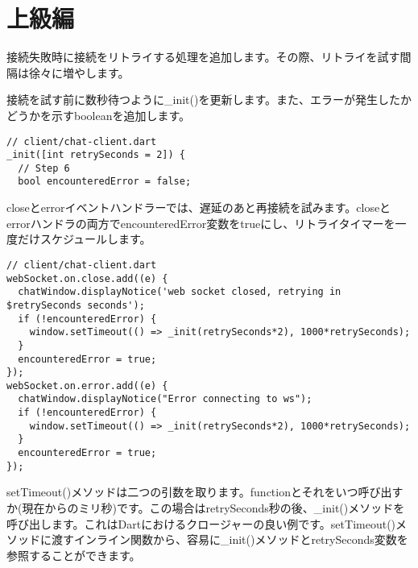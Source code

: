 
\section{上級編}

接続失敗時に接続をリトライする処理を追加します。その際、リトライを試す間隔は徐々に増やします。

接続を試す前に数秒待つように\_init()を更新します。また、エラーが発生したかどうかを示すbooleanを追加します。

\begin{verbatim}
// client/chat-client.dart
_init([int retrySeconds = 2]) {
  // Step 6
  bool encounteredError = false;
\end{verbatim}

closeとerrorイベントハンドラーでは、遅延のあと再接続を試みます。closeとerrorハンドラの両方でencounteredError変数をtrueにし、リトライタイマーを一度だけスケジュールします。

\begin{verbatim}
// client/chat-client.dart
webSocket.on.close.add((e) {
  chatWindow.displayNotice('web socket closed, retrying in $retrySeconds seconds');
  if (!encounteredError) {
    window.setTimeout(() => _init(retrySeconds*2), 1000*retrySeconds);
  }
  encounteredError = true;
});
webSocket.on.error.add((e) {
  chatWindow.displayNotice("Error connecting to ws");
  if (!encounteredError) {
    window.setTimeout(() => _init(retrySeconds*2), 1000*retrySeconds);
  }
  encounteredError = true;
});
\end{verbatim}

setTimeout()メソッドは二つの引数を取ります。functionとそれをいつ呼び出すか(現在からのミリ秒)です。この場合はretrySeconds秒の後、\_init()メソッドを呼び出します。これはDartにおけるクロージャーの良い例です。setTimeout()メソッドに渡すインライン関数から、容易に\_init()メソッドとretrySeconds変数を参照することができます。

